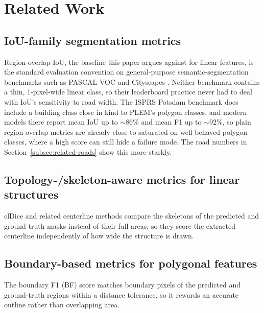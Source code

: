 \section{Related Work}
\label{sec:related}

\subsection{IoU-family segmentation metrics}
Region-overlap IoU, the baseline this paper argues against for linear features, is the standard
evaluation convention on general-purpose semantic-segmentation benchmarks such as PASCAL VOC
\cite{everingham2010pascalvoc} and Cityscapes \cite{cordts2016cityscapes}. Neither benchmark
contains a thin, 1-pixel-wide linear class, so their leaderboard practice never had to deal with
IoU's sensitivity to road width. The ISPRS Potsdam benchmark
\cite{rottensteiner2012isprs,rottensteiner2014isprs} does include a building class close in kind
to PLEM's polygon classes, and modern models there report mean IoU up to ${\sim}86\%$ and mean F1
up to ${\sim}92\%$, so plain region-overlap metrics are already close to saturated on well-behaved
polygon classes, where a high score can still hide a failure mode. The road numbers in
Section~\ref{subsec:related-roads} show this more starkly.

\subsection{Topology-/skeleton-aware metrics for linear structures}
clDice \cite{shit2021cldice} and related centerline methods compare the skeletons of the predicted
and ground-truth masks instead of their full areas, so they score the extracted centerline
independently of how wide the structure is drawn.

\subsection{Boundary-based metrics for polygonal features}
The boundary F1 (BF) score \cite{csurka2013evaluation} matches boundary pixels of the predicted and
ground-truth regions within a distance tolerance, so it rewards an accurate outline rather than
overlapping area.


